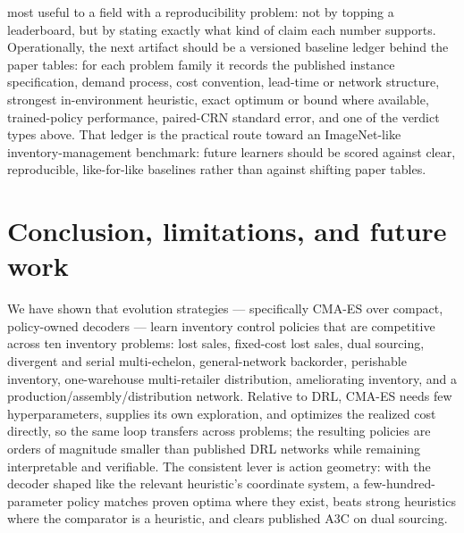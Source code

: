 \documentclass[11pt]{article}
\begin{document}
most useful to a field with a reproducibility problem: not by topping a leaderboard, but by stating
exactly what kind of claim each number supports.
Operationally, the next artifact should be a versioned baseline ledger behind the paper tables: for
each problem family it records the published instance specification, demand process, cost convention,
lead-time or network structure, strongest in-environment heuristic, exact optimum or bound where available,
trained-policy performance, paired-CRN standard error, and one of the verdict types above. That ledger
is the practical route toward an ImageNet-like inventory-management benchmark: future learners should
be scored against clear, reproducible, like-for-like baselines rather than against shifting paper
tables.

\section{Conclusion, limitations, and future work}
\label{sec:conclusion}

We have shown that evolution strategies --- specifically CMA-ES over compact, policy-owned decoders ---
learn inventory control policies that are competitive across ten inventory problems: lost sales,
fixed-cost lost sales, dual sourcing, divergent and serial multi-echelon, general-network backorder,
perishable inventory, one-warehouse multi-retailer distribution, ameliorating inventory, and a
production/assembly/distribution network. Relative to DRL, CMA-ES needs few hyperparameters, supplies
its own exploration, and optimizes the realized cost directly, so the same loop transfers across
problems; the resulting policies are orders of magnitude smaller than published DRL networks while
remaining interpretable and verifiable. The consistent lever is action geometry: with the decoder
shaped like the relevant heuristic's coordinate system, a few-hundred-parameter policy matches proven
optima where they exist, beats strong heuristics where the comparator is a heuristic, and clears
published A3C on dual sourcing.
\end{document}

